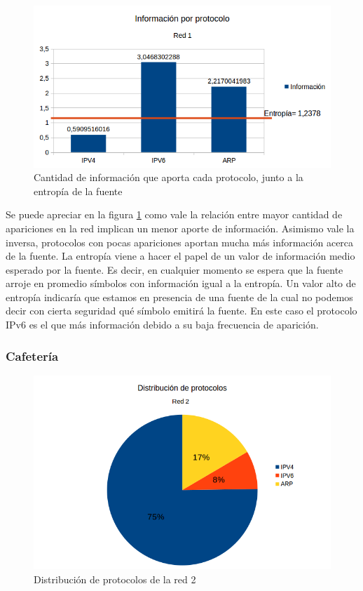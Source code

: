 \begin{figure}[H]
	\centering
	\includegraphics[scale=0.65]{imgs/red1_capturar_entropia.png}
	\caption{Cantidad de información que aporta cada protocolo, junto a la entropía de la fuente}
      \label{red1_capturar_entropia}
\end{figure}

Se puede apreciar en la figura \ref{red1_capturar_entropia} como vale la relación entre mayor cantidad de apariciones en la red implican un menor aporte de información. Asimismo vale la inversa, protocolos con pocas apariciones aportan mucha más información acerca de la fuente. La entropía viene a hacer el papel de un valor de información medio esperado por la fuente. Es decir, en cualquier momento se espera que la fuente arroje en promedio símbolos con información igual a la entropía. Un valor alto de entropía indicaría que estamos en presencia de una fuente de la cual no podemos decir con cierta seguridad qué símbolo emitirá la fuente. En este caso el protocolo IPv6 es el que más información debido a su baja frecuencia de aparición.

\subsubsection{Cafetería}

\begin{figure}[H]
	\centering
	\includegraphics[scale=0.65]{imgs/red2_capturar.png}
	\caption{Distribución de protocolos de la red 2}
      \label{red2_capturar}
\end{figure}

